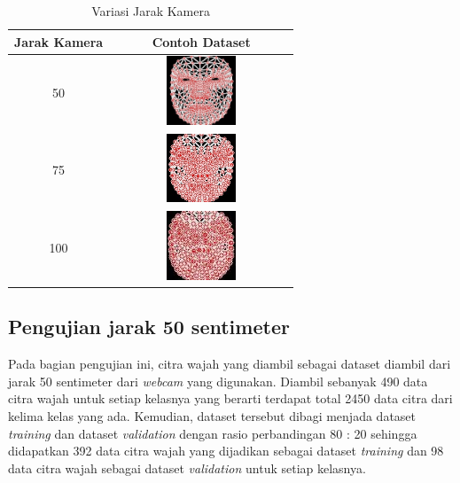 \begin{table}[H]
  \centering
  \begin{tabular}{|c|c|}
  \hline
  \textbf{Jarak Kamera} & \textbf{Contoh Dataset} \\ \hline
  50 & \includegraphics[width=0.4\textwidth]{gambar/50 stop.jpg} \\ \hline
  75 & \includegraphics[width=0.4\textwidth]{gambar/75 stop.jpg} \\ \hline
  100 & \includegraphics[width=0.4\textwidth]{gambar/100 stop.jpg} \\ \hline
  \end{tabular}
  \caption{Variasi Jarak Kamera}
  \label{tab:Variasi Jarak Kamera}
  \end{table}

\subsection{Pengujian jarak 50 sentimeter}
Pada bagian pengujian ini, citra wajah yang diambil sebagai dataset diambil dari jarak 50 sentimeter dari \emph{webcam} yang digunakan. Diambil sebanyak 490 data citra wajah untuk setiap kelasnya yang berarti terdapat total 2450 data citra dari kelima kelas yang ada. Kemudian, dataset tersebut dibagi menjada dataset \emph{training} dan dataset \emph{validation} dengan rasio perbandingan 80 : 20 sehingga didapatkan 392 data citra wajah yang dijadikan sebagai dataset \emph{training} dan 98 data citra wajah sebagai dataset \emph{validation} untuk setiap kelasnya.

